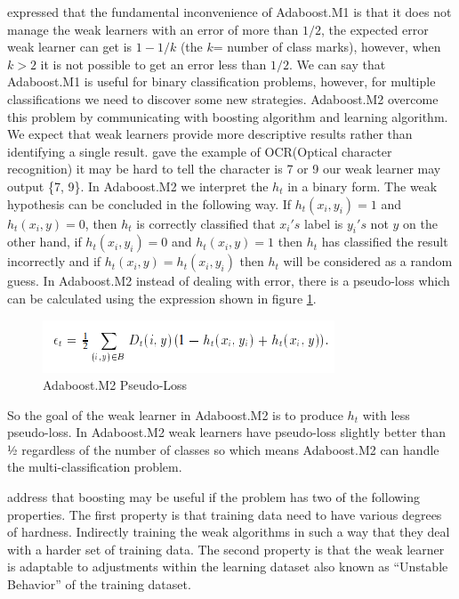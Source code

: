 \documentclass[12pt]{article}
\begin{document}
\citep{freund1996experiments} expressed that the fundamental inconvenience of Adaboost.M1 is that it does not manage the weak learners with an error of more than $1/2$, the expected error weak learner can get is $1 - 1/k$ (the $k$= number of class marks), however, when $k > 2$ it is not possible to get an error less than $1/2$. We can say that Adaboost.M1 is useful for binary classification problems, however, for multiple classifications we need to discover some new strategies. Adaboost.M2 overcome this problem by communicating with boosting algorithm and learning algorithm. We expect that weak learners provide more descriptive results rather than identifying a single result.
 \citep{freund1996experiments} gave the example of OCR(Optical character recognition) it may be hard to tell the character is 7 or 9 our weak learner may output \{7, 9\}. In Adaboost.M2 we interpret the $h_t$ in a binary form. The weak hypothesis can be concluded in the following way. If $h_t(x_i, y_i) = 1$ and $h_t(x_i, y)=0$, then $h_t$ is correctly classified that $x_i's$ label is $y_i's$ not $y$ on the other hand, if $h_t(x_i, y_i) = 0$ and $h_t(x_i, y)=1$ then $h_t$ has classified the result incorrectly and if $h_t(x_i, y)=h_t(x_i, y_i)$ then $h_t$ will be considered as a random guess. In Adaboost.M2 instead of dealing with error, there is a pseudo-loss which can be calculated using the expression shown in figure \ref{fig:pseudoLoss}. 
 \begin{figure}[h!]
 	\centering
 	\includegraphics{pseudoLoss.png}
 	\caption{Adaboost.M2 Pseudo-Loss ~ \citep{freund1996experiments}}
 	\label{fig:pseudoLoss}
 \end{figure}
 So the goal of the weak learner in Adaboost.M2 is to produce $h_t$ with less pseudo-loss. In Adaboost.M2 weak learners have pseudo-loss slightly better than ½ regardless of the number of classes so which means Adaboost.M2 can handle the multi-classification problem.
 
 
\citep{freund1996experiments} address that boosting may be useful if the problem has two of the following properties. The first property is that training data need to have various degrees of hardness. Indirectly training the weak algorithms in such a way that they deal with a harder set of training data. The second property is that the weak learner is adaptable to adjustments within the learning dataset also known as “Unstable Behavior” of the training dataset.
\end{document}
